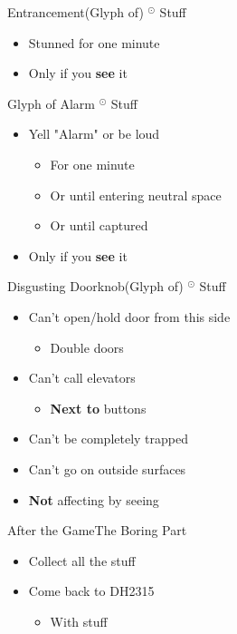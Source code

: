 \documentclass[17pt]{beamer}
\newcommand{\subitem}[1]{\begin{itemize} \item #1 \end{itemize}}
\newcommand{\sep}{ $^\odot$ }
\begin{document}
\begin{frame}{Entrancement}{(Glyph of) \sep Stuff}
  \begin{itemize}
  \item Stunned for one minute
  \item Only if you \textbf{see} it
  \end{itemize}
\end{frame}

\begin{frame}{Glyph of Alarm}{\sep Stuff}
  \begin{itemize}
  \item Yell "Alarm" or be loud
  \begin{itemize}
    \item For one minute
    \item Or until entering neutral space
    \item Or until captured
  \end{itemize}
  \item Only if you \textbf{see} it
  \end{itemize}
\end{frame}

\begin{frame}{Disgusting Doorknob}{(Glyph of) \sep Stuff}
  \begin{itemize}
  \item Can't open/hold door from this side
  \subitem{Double doors}
  \item Can't call elevators
  \subitem{\textbf{Next to} buttons}
  \item Can't be completely trapped
  \item Can't go on outside surfaces
  \item \textbf{Not} affecting by seeing
  \end{itemize}
\end{frame}

\begin{frame}{After the Game}{The Boring Part}
  \begin{itemize}
     \item Collect all the stuff
     \item Come back to DH2315
     \subitem{With stuff}
   \end{itemize}
\end{frame}
\end{document}
